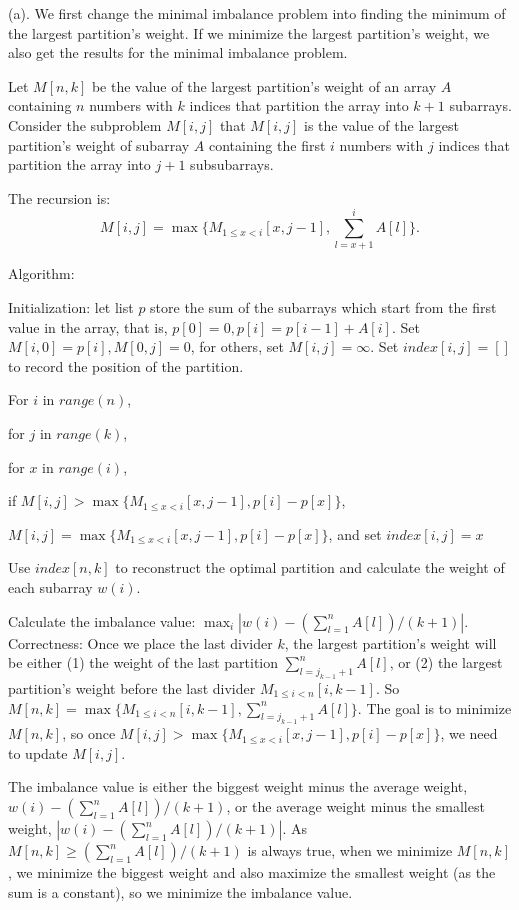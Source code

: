 \documentclass[11pt]{article} %
\begin{document}
(a). We first change the minimal imbalance problem into finding the minimum of the largest partition's weight. If we minimize the largest partition's weight, we also get the results for the minimal imbalance problem. 

Let $M[n, k]$ be the value of the largest partition's weight of an array $A$ containing $n$ numbers with $k$ indices that partition the array into $k+1$ subarrays. 
Consider the subproblem $M[i, j]$ that $M[i, j]$ is the value of the largest partition's weight of subarray $A$ containing the first $i$ numbers with $j$ indices that partition the array into $j+1$ subsubarrays. 

The recursion is: $$M[i, j] = \max\{M_{1 \leq x < i}[x, j-1], \sum_{l=x+1}^i A[l]\}.$$

\noindent
Algorithm:

\noindent
Initialization: let list $p$ store the sum of the subarrays which start from the first value in the array, that is, $p[0]=0, p[i]=p[i-1]+A[i]$.
Set $M[i, 0]=p[i], M[0, j]=0$, for others, set $M[i, j]=\infty$. Set $index[i, j]=[]$ to record the position of the partition.

\noindent
For $i$ in $range(n)$, 

\quad for $j$ in $range(k)$, 
	
\quad \quad for $x$ in $range(i)$,
		
\quad	\quad	\quad	if $M[i, j] > \max\{M_{1 \leq x < i}[x, j-1], p[i]-p[x] \}$,

\quad	\quad	\quad	\quad $M[i, j] = \max\{M_{1 \leq x < i}[x, j-1], p[i]-p[x] \}$, and set $index[i, j] = x$

\noindent
Use $index[n, k]$ to reconstruct the optimal partition and calculate the weight of each subarray $w(i)$. 

\noindent
Calculate the imbalance value: $\max_i |w(i) - (\sum_{l=1}^n A[l]) / (k+1)|$.\\

Correctness:
Once we place the last divider $k$, the largest partition's weight will be either
(1) the weight of the last partition $\sum_{l=j_{k-1}+1}^n A[l]$,
or (2) the largest partition's weight before the last divider $M_{1 \leq i < n}[i, k-1]$. 
So $M[n, k] = \max\{M_{1 \leq i < n}[i, k-1], \sum_{l=j_{k-1}+1}^n A[l]\}$.
The goal is to minimize $M[n, k]$, so once $M[i, j] > \max\{M_{1 \leq x < i}[x, j-1], p[i]-p[x] \}$, we need to update $M[i, j]$. 

The imbalance value is either the biggest weight minus the average weight, $w(i) - (\sum_{l=1}^n A[l]) / (k+1)$, or the average weight minus the smallest weight, $|w(i) - (\sum_{l=1}^n A[l]) / (k+1)|$.
As $M[n,k] \geq (\sum_{l=1}^n A[l]) / (k+1)$ is always true, when we minimize $M[n, k]$, we minimize the biggest weight and also maximize the smallest weight (as the sum is a constant), so we minimize the imbalance value.
\end{document}
